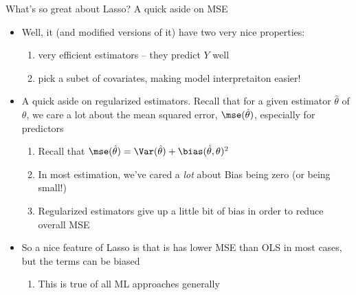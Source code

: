\begin{frame}[allowframebreaks]{What's so great about Lasso? A quick aside on MSE}
    \begin{itemize}
    \item Well, it (and modified versions of it) have two very nice properties:
      \begin{enumerate}[-]
      \item very efficient estimators -- they predict $Y$ well
      \item pick a subet of covariates, making model interpretaiton easier! 
      \end{enumerate}
    \item A quick aside on regularized estimators. Recall that for a
      given estimator $\hat{\theta}$ of $\theta$, we care a lot about
      the mean squared error, $\mse(\hat{\theta})$, especially for predictors
      \begin{enumerate}[-]
      \item Recall that  $\mse(\hat{\theta}) = \Var(\hat{\theta}) + \bias(\hat{\theta}, \theta)^{2}$
      \item In most estimation, we've cared a \emph{lot} about Bias being zero (or being small!)
      \item Regularized estimators give up a little bit of bias in order
        to reduce overall MSE
      \end{enumerate}
    \item So a nice feature of Lasso is that is has lower MSE than OLS
      in most cases, but the terms can be biased
      \begin{enumerate}[-]
      \item This is true of all ML approaches generally
      \end{enumerate}
    \end{itemize}
  \end{frame}
  
